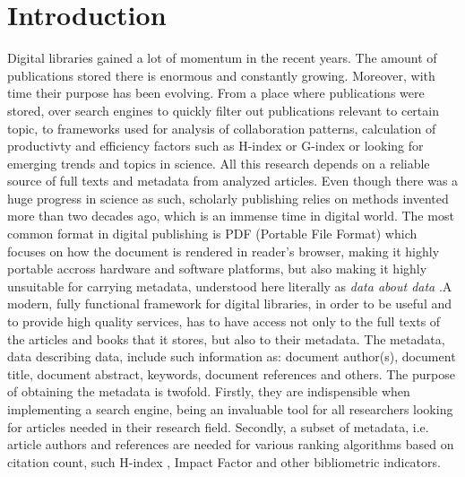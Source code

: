 \chapter{Introduction}
Digital libraries gained a lot of momentum in the recent years. The amount of publications stored there is enormous and constantly growing. Moreover, with time their purpose has been evolving. From a place where publications were stored, over search engines to quickly filter out publications relevant to certain topic, to frameworks used for analysis of collaboration patterns, calculation of productivty and efficiency factors such as H-index or G-index or looking for emerging trends and topics in science. All this research depends on a reliable source of full texts and metadata from analyzed articles.
Even though there was a huge progress in science as such, scholarly publishing relies on methods invented more than two decades ago, which is an immense time in digital world. The most common format in digital publishing is PDF (Portable File Format) which focuses on how the document is rendered in reader's browser, making it highly portable accross hardware and software platforms, but also making it highly unsuitable for carrying metadata, understood here literally as \textit{data about data}
.A modern, fully functional framework for digital libraries, in order to be useful and to provide high quality services, has to have access not only to the full texts of the articles and books that it stores, but also to their metadata. The metadata, data describing data, include such information as: document author(s), document title, document abstract, keywords, document references and others. The purpose of obtaining the metadata is twofold. Firstly, they are indispensible when implementing a search engine, being an invaluable tool for all researchers looking for articles needed in their research field. Secondly, a subset of metadata, i.e. article authors and references are needed for various ranking algorithms based on citation count, such H-index \cite{Hirsch2005}, Impact Factor and other bibliometric indicators.
